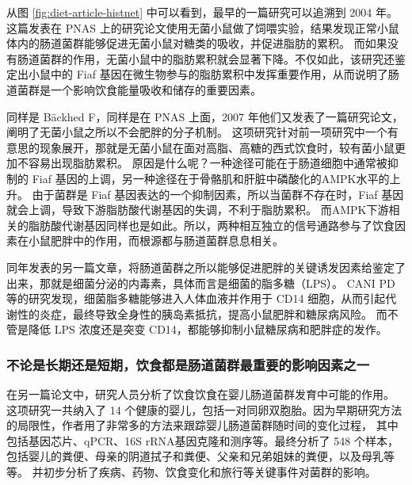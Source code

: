 \documentclass[]{ctexbook}
\begin{document}
从图 \ref{fig:diet-article-histnet} 中可以看到，最早的一篇研究可以追溯到 2004 年\citep{backhedGutMicrobiotaEnvironmental2004}。
这篇发表在 PNAS 上的研究论文使用无菌小鼠做了饲喂实验，结果发现正常小鼠体内的肠道菌群能够促进无菌小鼠对糖类的吸收，并促进脂肪的累积。
而如果没有肠道菌群的作用，无菌小鼠中的脂肪累积就会显著下降。不仅如此，该研究还鉴定出小鼠中的 Fiaf 基因在微生物参与的脂肪累积中发挥重要作用，从而说明了肠道菌群是一个影响饮食能量吸收和储存的重要因素。

同样是 Bäckhed F，同样是在 PNAS 上面，2007 年他们又发表了一篇研究论文，阐明了无菌小鼠之所以不会肥胖的分子机制\citep{backhedMechanismsUnderlyingResistance2007}。
这项研究针对前一项研究中一个有意思的现象展开，那就是无菌小鼠在面对高脂、高糖的西式饮食时，较有菌小鼠更加不容易出现脂肪累积。
原因是什么呢？一种途径可能在于肠道细胞中通常被抑制的 Fiaf 基因的上调，另一种途径在于骨骼肌和肝脏中磷酸化的AMPK水平的上升。
由于菌群是 Fiaf 基因表达的一个抑制因素，所以当菌群不存在时，Fiaf 基因就会上调，导致下游脂肪酸代谢基因的失调，不利于脂肪累积。
而AMPK下游相关的脂肪酸代谢基因同样也是如此。所以，两种相互独立的信号通路参与了饮食因素在小鼠肥胖中的作用，而根源都与肠道菌群息息相关。

同年发表的另一篇文章，将肠道菌群之所以能够促进肥胖的关键诱发因素给鉴定了出来，那就是细菌分泌的内毒素，具体而言是细菌的脂多糖（LPS）\citep{caniMetabolicEndotoxemiaInitiates2007}。
CANI PD 等的研究发现，细菌脂多糖能够进入人体血液并作用于 CD14 细胞，从而引起代谢性的炎症，最终导致全身性的胰岛素抵抗，提高小鼠肥胖和糖尿病风险。
而不管是降低 LPS 浓度还是突变 CD14，都能够抑制小鼠糖尿病和肥胖症的发作。

\hypertarget{ux4e0dux8bbaux662fux957fux671fux8fd8ux662fux77edux671fux996eux98dfux90fdux662fux80a0ux9053ux83ccux7fa4ux6700ux91cdux8981ux7684ux5f71ux54cdux56e0ux7d20ux4e4bux4e00}{%
\subsubsection{不论是长期还是短期，饮食都是肠道菌群最重要的影响因素之一}\label{ux4e0dux8bbaux662fux957fux671fux8fd8ux662fux77edux671fux996eux98dfux90fdux662fux80a0ux9053ux83ccux7fa4ux6700ux91cdux8981ux7684ux5f71ux54cdux56e0ux7d20ux4e4bux4e00}}

在另一篇论文中，研究人员分析了饮食饮食在婴儿肠道菌群发育中可能的作用\citep{palmerDevelopmentHumanInfant2007}。
这项研究一共纳入了 14 个健康的婴儿，包括一对同卵双胞胎。因为早期研究方法的局限性，作者用了非常多的方法来跟踪婴儿肠道菌群随时间的变化过程，
其中包括基因芯片、qPCR、16S rRNA基因克隆和测序等。最终分析了 548 个样本，包括婴儿的粪便、母亲的阴道拭子和粪便、父亲和兄弟姐妹的粪便，以及母乳等等。
并初步分析了疾病、药物、饮食变化和旅行等关键事件对菌群的影响。
\end{document}
